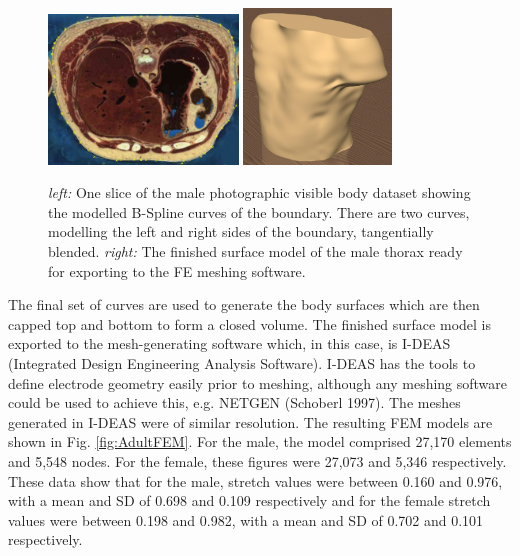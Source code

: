 \documentclass[12pt]{iopart}
\begin{document}
\begin{figure}[bhtp]
\begin{center}
  \includegraphics[width= 0.45\textwidth]
         {figures/adult-slice.jpg}
  \includegraphics[width= 0.35\textwidth]
         {figures/adult-model.jpg}

\caption{ \label{fig:Adultmodel}
{\em left:} One slice of the male photographic visible body dataset showing the modelled B-Spline curves of the boundary.  There are two curves, modelling the left and right sides of the boundary, tangentially blended.
{\em right:} The finished surface model of the male thorax ready for exporting to the FE meshing software.
}
\end{center}
\end{figure}

The final set of curves are used to generate the body surfaces which are
then capped top and bottom to form a closed volume. The finished surface
model is exported to the mesh-generating software which, in this case,
is I-DEAS (Integrated Design Engineering Analysis Software).
I-DEAS has the tools to define electrode geometry easily prior to meshing,
although any meshing software could be used to achieve this,
e.g. NETGEN (Schoberl 1997).
The meshes generated in I-DEAS were of similar resolution.  The
resulting FEM models are shown in Fig. \ref{fig:AdultFEM}.
For the male, the model comprised 27,170 elements and 5,548 nodes.
For the female, these figures were 27,073 and 5,346 respectively.
These data show that for the male, stretch values were between 0.160
and 0.976, with a mean and SD of 0.698 and 0.109 respectively and for
the female stretch values were between 0.198 and 0.982, with a mean and
SD of 0.702 and 0.101 respectively.
\end{document}
